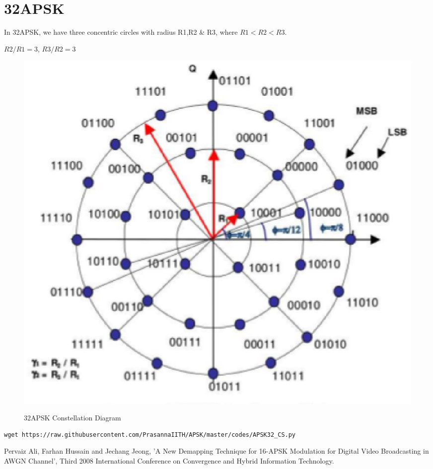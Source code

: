 \documentclass[journal,12pt,twocolumn]{IEEEtran}
\begin{document}
\section{32APSK}
In 32APSK, we have three concentric circles with radius R1,R2 \& R3, where $R1<R2<R3$.
\begin{center}
$R2/R1 = 3$, $R3/R2 = 3$
\end{center} 
\begin{figure}[h!]
\centering
\includegraphics[scale=0.4]{figs/32APSK.eps}
\label{32APSK Constellation Diagram}
\caption{32APSK Constellation Diagram}
\end{figure}
\begin{lstlisting}
wget https://raw.githubusercontent.com/PrasannaIITH/APSK/master/codes/APSK32_CS.py
\end{lstlisting}

\begin{thebibliography}{00}
 Pervaiz Ali, Farhan Hussain and Jechang Jeong, 'A New Demapping Technique for 16-APSK Modulation for Digital Video Broadcasting in AWGN Channel', Third 2008 International Conference on Convergence and Hybrid Information Technology. 
\end{thebibliography}
\end{document}
